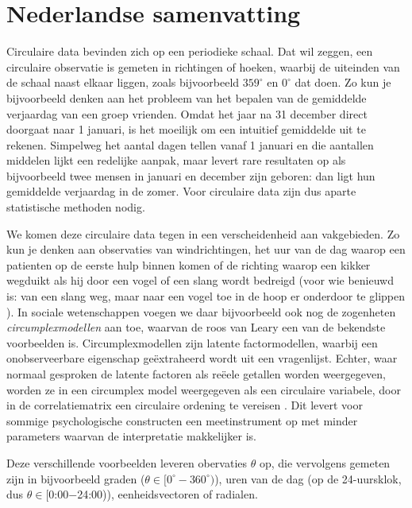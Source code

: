 \documentclass[12pt, a4paper]{book}\usepackage[]{graphicx}\usepackage{xcolor}
\begin{document}
\label{circbays}


\backmatter

\chapter{Nederlandse samenvatting}

Circulaire data bevinden zich op een periodieke schaal. Dat wil zeggen, een circulaire observatie is gemeten in richtingen of hoeken, waarbij de uiteinden van de schaal naast elkaar liggen, zoals bijvoorbeeld $359^\circ$ en $0^\circ$ dat doen. Zo kun je bijvoorbeeld denken aan het probleem van het bepalen van de gemiddelde verjaardag van een groep vrienden. Omdat het jaar na 31 december direct doorgaat naar 1 januari, is het moeilijk om een intuitief gemiddelde uit te rekenen. Simpelweg het aantal dagen tellen vanaf 1 januari en die aantallen middelen lijkt een redelijke aanpak, maar levert rare resultaten op als bijvoorbeeld twee mensen in januari en december zijn geboren: dan ligt hun gemiddelde verjaardag in de zomer. Voor circulaire data zijn dus aparte statistische methoden nodig.

We komen deze circulaire data tegen in een verscheidenheid aan vakgebieden. Zo kun je denken aan observaties van windrichtingen,  het uur van de dag waarop een patienten op de eerste hulp binnen komen of de richting waarop een kikker wegduikt als hij door een vogel of een slang wordt bedreigd (voor wie benieuwd is: van een slang weg, maar naar een vogel toe in de hoop er onderdoor te glippen \citep{bulbert2015danger}). In sociale wetenschappen voegen we daar bijvoorbeeld ook nog de zogenheten \textit{circumplexmodellen} aan toe, waarvan de roos van Leary \citep{Leary1957} een van de bekendste voorbeelden is. Circumplexmodellen zijn latente factormodellen, waarbij een onobserveerbare eigenschap ge\"extraheerd wordt uit een vragenlijst. Echter, waar normaal gesproken de latente factoren als re\"eele getallen worden weergegeven, worden ze in een circumplex model weergegeven als een circulaire variabele, door in de correlatiematrix een circulaire ordening te vereisen \citep{browne1992circumplex}. Dit levert voor sommige psychologische constructen een meetinstrument op met minder parameters waarvan de interpretatie makkelijker is.

Deze verschillende voorbeelden leveren obervaties $\theta$ op, die vervolgens gemeten zijn in bijvoorbeeld graden ($\theta \in [0^\circ - 360^\circ)$), uren van de dag (op de 24-uursklok, dus $\theta \in [$0:00$ - $24:00)), eenheidsvectoren of radialen.
\end{document}
